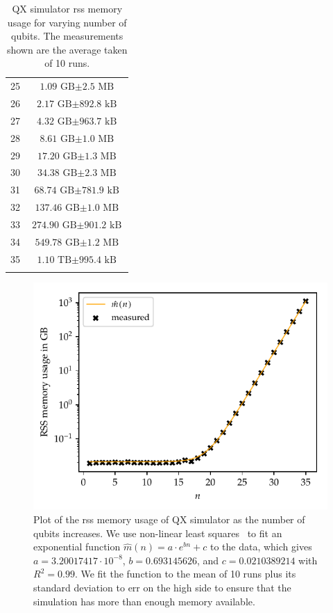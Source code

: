 \begin{table}[H]
\begin{tabular}{cc}
        25 & $\text{1.09 GB} \pm \text{2.5 MB}$ \\
        26 & $\text{2.17 GB} \pm \text{892.8 kB}$ \\
        27 & $\text{4.32 GB} \pm \text{963.7 kB}$ \\
        28 & $\text{8.61 GB} \pm \text{1.0 MB}$ \\
        29 & $\text{17.20 GB} \pm \text{1.3 MB}$ \\
        30 & $\text{34.38 GB} \pm \text{2.3 MB}$ \\
        31 & $\text{68.74 GB} \pm \text{781.9 kB}$ \\
        32 & $\text{137.46 GB} \pm \text{1.0 MB}$ \\
        33 & $\text{274.90 GB} \pm \text{901.2 kB}$ \\
        34 & $\text{549.78 GB} \pm \text{1.2 MB}$ \\
        35 & $\text{1.10 TB} \pm \text{995.4 kB}$ \\
        
        \phantom{36} & \\
    \end{tabular}
    \caption[QX simulator \gls{rss} memory usage for varying number of qubits.]{
        QX simulator \gls{rss} memory usage for varying number of qubits.
        The measurements shown are the average taken of 10 runs.
    }
    \label{table:qx-memory-usage}
\end{table}

\begin{figure}[ht]
    \centering
    \includegraphics[width=0.765\linewidth]{figures/qx_memory_plot.pdf}
    
    \caption[Plot of the \gls{rss} memory usage of QX simulator as the number of qubits increases.]{
        Plot of the \gls{rss} memory usage of QX simulator as the number of qubits increases.
        We use non-linear least squares~\cite{branch1999subspace} to fit an exponential function $\hat{m}(n) = a \cdot e^{bn} + c$ to the data, which gives $a = 3.20017417 \cdot 10^{-8}$, $b = 0.693145626$, and $c = 0.0210389214$ with $R^2 = 0.99$.
        We fit the function to the mean of 10 runs plus its standard deviation to err on the high side to ensure that the simulation has more than enough memory available.
    }
    \label{fig:qx-memory-plot}
\end{figure}

